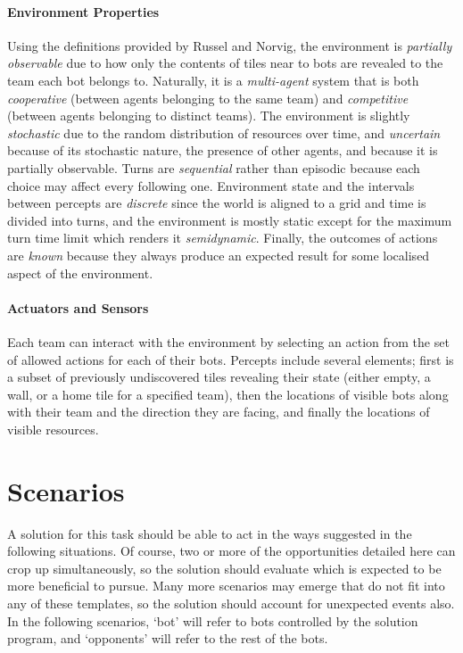\documentclass[a4paper,10pt]{article}
\begin{document}
\paragraph{Environment Properties}
Using the definitions provided by Russel and Norvig\cite{norvig10}, the environment is \emph{partially observable} due to how only the contents of tiles near to bots are revealed to the team each bot belongs to. Naturally, it is a \emph{multi-agent} system that is both \emph{cooperative} (between agents belonging to the same team) and \emph{competitive} (between agents belonging to distinct teams). The environment is slightly \emph{stochastic} due to the random distribution of resources over time, and \emph{uncertain} because of its stochastic nature, the presence of other agents, and because it is partially observable. Turns are \emph{sequential} rather than episodic because each choice may affect every following one. Environment state and the intervals between percepts are \emph{discrete} since the world is aligned to a grid and time is divided into turns, and the environment is mostly static except for the maximum turn time limit which renders it \emph{semidynamic}. Finally, the outcomes of actions are \emph{known} because they always produce an expected result for some localised aspect of the environment.

\paragraph{Actuators and Sensors}
Each team can interact with the environment by selecting an action from the set of allowed actions for each of their bots. Percepts include several elements; first is a subset of previously undiscovered tiles revealing their state (either empty, a wall, or a home tile for a specified team), then the locations of visible bots along with their team and the direction they are facing, and finally the locations of visible resources.

\section{Scenarios}
A solution for this task should be able to act in the ways suggested in the following situations. Of course, two or more of the opportunities detailed here can crop up simultaneously, so the solution should evaluate which is expected to be more beneficial to pursue. Many more scenarios may emerge that do not fit into any of these templates, so the solution should account for unexpected events also. In the following scenarios, `bot' will refer to bots controlled by the solution program, and `opponents' will refer to the rest of the bots.
\end{document}
